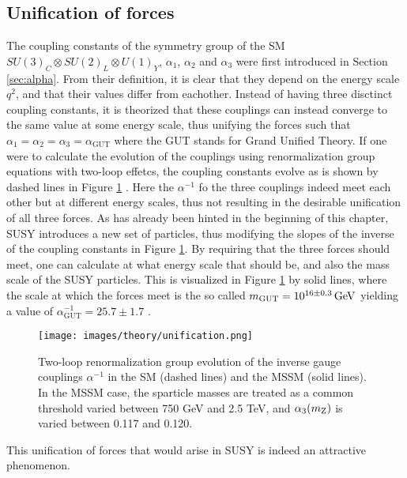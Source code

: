 \subsection*{Unification of forces}
\noindent\justify
The coupling constants of the symmetry group of the SM $SU(3)_{C}\otimes SU(2)_{L}\otimes U(1)_{Y}$, $\alpha_{1}$, $\alpha_{2}$ and $\alpha_{3}$ were first introduced in Section \ref{sec:alpha}. 
From their definition, it is clear that they depend on the energy scale $q^{2}$, and that their values differ from eachother. 
Instead of having three disctinct coupling constants, it is theorized that these couplings can instead converge to the same value at some energy scale, thus unifying the forces such that $\alpha_{1}=\alpha_{2}=\alpha_{3}=\alpha_{\mathrm{GUT}}$ where the GUT stands for Grand Unified Theory. 
If one were to calculate the evolution of the couplings using renormalization group equations with two-loop effetcs, the coupling constants evolve as is shown by dashed lines in Figure \ref{fig:unification} \cite{Martin:1997ns}.
Here the $\alpha^{-1}$ fo the three couplings indeed meet each other but at different energy scales, thus not resulting in the desirable unification of all three forces.   
As has already been hinted in the beginning of this chapter, SUSY introduces a new set of particles, thus modifying the slopes of the inverse of the coupling constants in Figure \ref{fig:unification}.
By requiring that the three forces should meet, one can calculate at what energy scale that should be, and also the mass scale of the SUSY particles. 
This is visualized in Figure \ref{fig:unification} by solid lines, where the scale at which the forces meet is the so called $m_{\mathrm{GUT}}=10^{16\pm 0.3}\,\text{Ge\hspace{-.08em}V}$ yielding a value of $\alpha_{\mathrm{GUT}}^{-1}=25.7\pm1.7$ \cite{Amaldi:1991cn}. 
\begin{figure}[htbp!]
\begin{center}
    \texttt{[image: images/theory/unification.png]}
    \caption{Two-loop renormalization group evolution of the inverse gauge couplings $\alpha^{-1}$ in the SM (dashed lines) and the MSSM (solid lines). 
In the MSSM case, the sparticle masses are treated as a common threshold varied between 750 GeV and 2.5 TeV, and $\alpha_{3}(m_{\mathrm{Z}})$ is varied between 0.117 and 0.120. \cite{Martin:1997ns}}
\label{fig:unification}
\end{center}
\end{figure}                                                                         
This unification of forces that would arise in SUSY is indeed an attractive phenomenon. 
